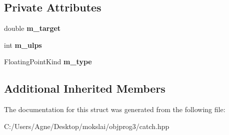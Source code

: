 \subsection*{Private Attributes}
\begin{DoxyCompactItemize}
\item 
\mbox{\label{struct_catch_1_1_matchers_1_1_floating_1_1_within_ulps_matcher_a97b0112726f510af8ca22cb490c2b14d}} 
double {\bfseries m\+\_\+target}
\item 
\mbox{\label{struct_catch_1_1_matchers_1_1_floating_1_1_within_ulps_matcher_aa117ee9be2778cdfb3ad5e66e94de1b3}} 
int {\bfseries m\+\_\+ulps}
\item 
\mbox{\label{struct_catch_1_1_matchers_1_1_floating_1_1_within_ulps_matcher_ac5dc48ae38dbfe143647d450f03771ab}} 
Floating\+Point\+Kind {\bfseries m\+\_\+type}
\end{DoxyCompactItemize}
\subsection*{Additional Inherited Members}


The documentation for this struct was generated from the following file\+:\begin{DoxyCompactItemize}
\item 
C\+:/\+Users/\+Agne/\+Desktop/mokslai/objprog3/catch.\+hpp\end{DoxyCompactItemize}

